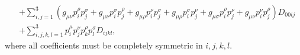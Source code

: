 \begin{draft}
\begin{subequations}
\begin{align}
            \nonumber
                                 & + \sum_{i,j=1}^3 (g_{\mu\nu}p_i^\rho p_j^\sigma + g_{\mu\nu}p_i^\sigma p_j^\rho + g_{\mu\rho}p_i^\nu p_j^\sigma + g_{\mu\rho}p_i^\sigma p_j^\nu + g_{\mu\sigma}p_i^\rho p_j^\nu + g_{\mu\nu}p_i^\nu p_j^\rho) D_{00ij} \\
                                 & + \sum_{i,j,k,l=1}^3 p_i^\mu p_j^\nu p_k^\rho p_l^\sigma D_{ijkl},
        \end{align}
    \end{subequations}
    where all coefficients must be completely symmetric in \(i,j,k,l\).
    \clearpage
\end{draft}
